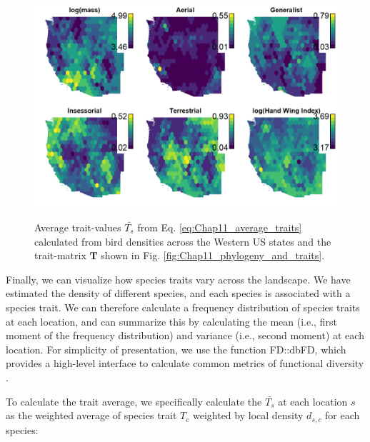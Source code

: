\begin{figure}[!ht]
    \caption[Community-weighted bird traits]{Average trait-values \(\bar{T_s}\) from Eq. \ref{eq:Chap11_average_traits} calculated from bird densities across the Western US states and the trait-matrix \(\mathbf{T}\) shown in Fig. \ref{fig:Chap11_phylogeny_and_traits}.}
    \includegraphics[width=5.5in]{Chap_11/community_weighted_traits.png}
    \label{fig:Chap11_community_weighted_traits}
\end{figure}

Finally, we can visualize how species traits vary across the landscape.  We have estimated the density of different species, and each species is associated with a species trait.  We can therefore calculate a frequency distribution of species traits at each location, and can summarize this by calculating the mean (i.e., first moment of the frequency distribution) and variance (i.e., second moment) at each location.  For simplicity of presentation, we use the function \colorbox{backcolour}{FD::dbFD}, which provides a high-level interface to calculate common metrics of functional diversity \cite{laliberte_distance-based_2010,laliberte_measuring_2014}.  

To calculate the trait average, we specifically calculate the  \(\bar{T_s}\) at each location \(s\) as the weighted average of species trait \(T_c\) weighted by local density \( d_{s,c} \) for each species:

